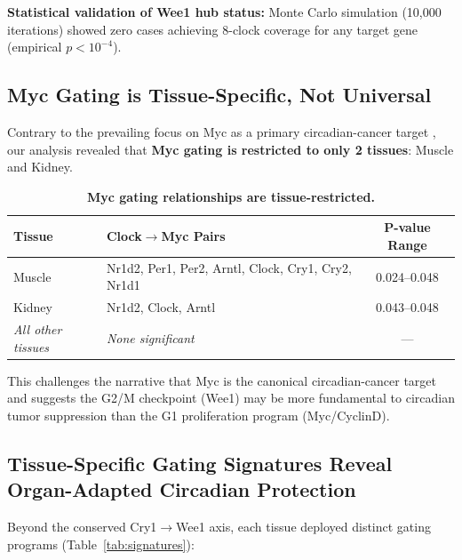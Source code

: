 \documentclass[11pt,a4paper]{article}
\begin{document}
\textbf{Statistical validation of Wee1 hub status:} Monte Carlo simulation (10,000 iterations) showed zero cases achieving 8-clock coverage for any target gene (empirical $p < 10^{-4}$).

\subsection{Myc Gating is Tissue-Specific, Not Universal}

Contrary to the prevailing focus on Myc as a primary circadian-cancer target \citep{altman2015}, our analysis revealed that \textbf{Myc gating is restricted to only 2 tissues}: Muscle and Kidney.

\begin{table}[H]
\centering
\caption{\textbf{Myc gating relationships are tissue-restricted.}}
\begin{tabular}{llc}
\toprule
\textbf{Tissue} & \textbf{Clock$\rightarrow$Myc Pairs} & \textbf{P-value Range} \\
\midrule
Muscle & Nr1d2, Per1, Per2, Arntl, Clock, Cry1, Cry2, Nr1d1 & 0.024--0.048 \\
Kidney & Nr1d2, Clock, Arntl & 0.043--0.048 \\
\textit{All other tissues} & \textit{None significant} & --- \\
\bottomrule
\end{tabular}
\end{table}

This challenges the narrative that Myc is the canonical circadian-cancer target and suggests the G2/M checkpoint (Wee1) may be more fundamental to circadian tumor suppression than the G1 proliferation program (Myc/CyclinD).

\subsection{Tissue-Specific Gating Signatures Reveal Organ-Adapted Circadian Protection}

Beyond the conserved Cry1$\rightarrow$Wee1 axis, each tissue deployed distinct gating programs (Table~\ref{tab:signatures}):
\end{document}
